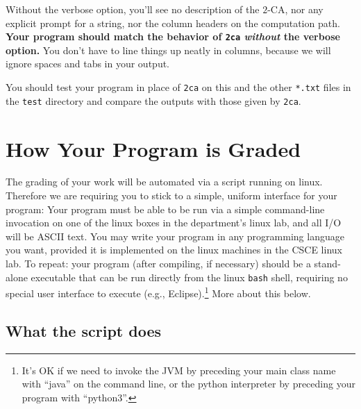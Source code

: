 \documentclass[11pt]{article}
\renewcommand{\t}[1]{\texttt{#1}}
\theoremstyle{definition}
\begin{document}
Without the verbose option, you'll see no description of the $2$-CA, nor any explicit prompt for a string, nor the column headers on the computation path.  {\bf Your program should match the behavior of \t{2ca} \emph{without} the verbose option.}  You don't have to line things up neatly in columns, because we will ignore spaces and tabs in your output.

You should test your program in place of \t{2ca} on this and the other \t{*.txt} files in the \t{test} directory and compare the outputs with those given by \t{2ca}.

\section{How Your Program is Graded}

The grading of your work will be automated via a script running on linux.
Therefore we are requiring you to stick to a simple, uniform interface for your program:  Your program must be able to be run via a simple command-line invocation on one of the linux boxes in the department's linux lab, and all I/O will be ASCII text.  You may write your program in any programming language you want, provided it is implemented on the linux machines in the CSCE linux lab.
To repeat: your program (after compiling, if necessary) should be a stand-alone executable that can be run directly from the linux \t{bash} shell, requiring no special user interface to execute (e.g., Eclipse).\footnote{It's OK if we need to invoke the JVM by preceding your main class name with ``java'' on the command line, or the python interpreter by preceding your program with ``python3''.}  More about this below.

\subsection{What the script does}

\end{document}
